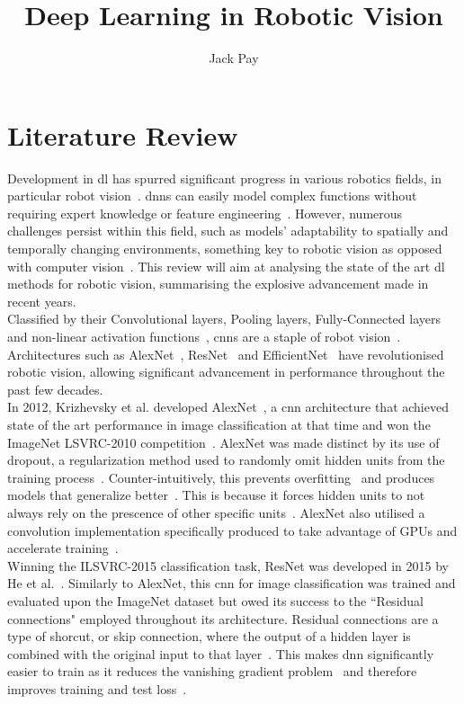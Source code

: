 \documentclass[11pt]{article}
\title{Deep Learning in Robotic Vision}
\author{Jack Pay}
\begin{document}
\maketitle

\section{Literature Review}
Development in \acrfull{dl} has spurred significant progress in various robotics fields, in particular robot vision~\cite{Deep_learning_in_robotics:_a_review}. \acrshort{dnn}s can easily model complex functions without requiring expert knowledge or feature engineering~\cite{Deep_learning_in_robotics:_a_review}. However, numerous challenges persist within this field, such as models' adaptability to spatially and temporally changing environments, something key to robotic vision as opposed with computer vision~\cite{limits_and_potentials_of_deep_learning_for_robotics, An_evaluation_of_EfficientDet}. This review will aim at analysing the state of the art \acrshort{dl} methods for robotic vision, summarising the explosive advancement made in recent years.\\
Classified by their Convolutional layers, Pooling layers, Fully-Connected layers and non-linear activation functions~\cite{Convolutional-neural-network:-a-review-of...}, \acrfull{cnns} are a staple of robot vision~\cite{A-Survey-on-Deep-Learning-Methods-for-Robot-Vision}. Architectures such as AlexNet~\cite{OG_Alexnet}, ResNet~\cite{OG_resnet} and EfficientNet~\cite{OG_EfficientNet} have revolutionised robotic vision, allowing significant advancement in performance throughout the past few decades.\\
In 2012, Krizhevsky et al. developed AlexNet~\cite{OG_Alexnet}, a \acrshort{cnn} architecture that achieved state of the art performance in image classification at that time and won the ImageNet LSVRC-2010 competition~\cite{OG_Alexnet}. AlexNet was made distinct by its use of dropout, a regularization method used to randomly omit hidden units from the training process~\cite{OG_dropout}. Counter-intuitively, this prevents overfitting~\cite{Avoiding_overfitting...} and produces models that generalize better~\cite{regularization}. This is because it forces hidden units to not always rely on the prescence of other specific units~\cite{OG_dropout}. AlexNet also utilised a convolution implementation specifically produced to take advantage of GPUs and accelerate training~\cite{OG_Alexnet}.\\ 
Winning the ILSVRC-2015 classification task, ResNet was developed in 2015 by He et al.~\cite{OG_resnet}. Similarly to AlexNet, this \acrshort{cnn} for image classification was trained and evaluated upon the ImageNet dataset but owed its success to the ``Residual connections" employed throughout its architecture. Residual connections are a type of shorcut, or skip connection, where the output of a hidden layer is combined with the original input to that layer~\cite{OG_resnet}. This makes \acrshort{dnn} significantly easier to train as it reduces the vanishing gradient problem~\cite{ResNet:_Solving_Vanishing_Gradient...} and therefore improves training and test loss~\cite{Demystifying_ResNet}.\\
\end{document}
